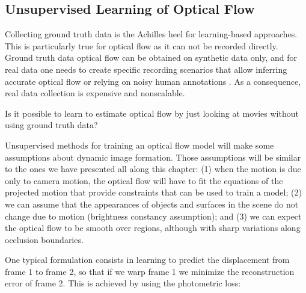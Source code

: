 





\subsection{Unsupervised Learning of Optical Flow}

Collecting ground truth data is the Achilles heel for learning-based approaches. This is particularly true for optical flow as it can not be recorded directly. Ground truth data optical flow can be obtained on synthetic data only, and for real data one needs to create specific recording scenarios that allow inferring accurate optical flow or relying on noisy human annotations \cite{Liu2008}. As a consequence, real data collection is expensive and nonscalable. 

Is it possible to learn to estimate optical flow by just looking at movies without using ground truth data? 

Unsupervised methods for training an optical flow model will make some assumptions about dynamic image formation. Those assumptions will be similar to the ones we have presented all along this chapter: (1) when the motion is due only to camera motion, the optical flow will have to fit the equations of the projected motion that provide constraints that can be used to train a model; (2) we can assume that the appearances of objects and surfaces in the scene do not change due to motion (brightness constancy assumption); and (3) we can expect the optical flow to be smooth over regions, although with sharp variations along occlusion boundaries. 

One typical formulation consists in learning to predict the displacement from frame 1 to frame 2, so that if we warp frame 1 we minimize the reconstruction error of frame 2. This is achieved by using the photometric loss:

